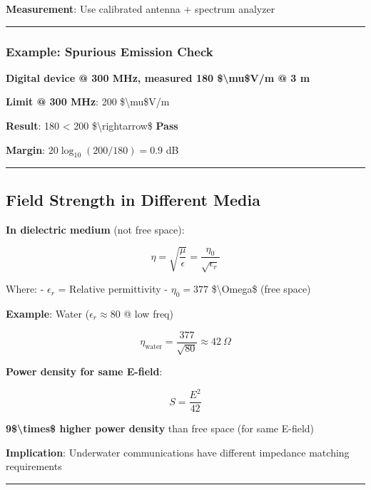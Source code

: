 \textbf{Measurement}: Use calibrated antenna + spectrum analyzer

\begin{center}\rule{0.5\linewidth}{0.5pt}\end{center}

\subsubsection{Example: Spurious Emission
Check}\label{example-spurious-emission-check}

\textbf{Digital device @ 300 MHz, measured 180 \$\textbackslash mu\$V/m
@ 3 m}

\textbf{Limit @ 300 MHz}: 200 \$\textbackslash mu\$V/m

\textbf{Result}: 180 \textless{} 200 \$\textbackslash rightarrow\$
\textbf{Pass}

\textbf{Margin}: \(20\log_{10}(200/180) = 0.9\) dB

\begin{center}\rule{0.5\linewidth}{0.5pt}\end{center}

\subsection{Field Strength in Different
Media}\label{field-strength-in-different-media}

\textbf{In dielectric medium} (not free space):

\[
\eta = \sqrt{\frac{\mu}{\epsilon}} = \frac{\eta_0}{\sqrt{\epsilon_r}}
\]

Where: - \(\epsilon_r\) = Relative permittivity - \(\eta_0 = 377\)
\$\textbackslash Omega\$ (free space)

\textbf{Example}: Water (\(\epsilon_r \approx 80\) @ low freq)

\[
\eta_{\text{water}} = \frac{377}{\sqrt{80}} \approx 42\ \Omega
\]

\textbf{Power density for same E-field}:

\[
S = \frac{E^2}{42}
\]

\textbf{9\$\textbackslash times\$ higher power density} than free space
(for same E-field)

\textbf{Implication}: Underwater communications have different impedance
matching requirements

\begin{center}\rule{0.5\linewidth}{0.5pt}\end{center}

